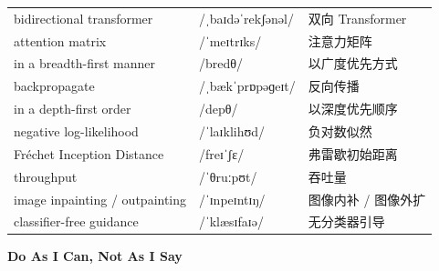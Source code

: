 \documentclass[UTF8,12pt,a4paper]{ctexart}
\providecommand{\zh}[1]{#1}
\begin{document}
\begin{tabular*}{\textwidth}{@{\extracolsep{\fill}}lll@{}}
bidirectional transformer & {\ipafont /ˌbaɪdəˈrekʃənəl/} & \zh{双向 Transformer} \\
attention matrix & {\ipafont /ˈmeɪtrɪks/} & \zh{注意力矩阵} \\
in a breadth-first manner & {\ipafont /bredθ/} & \zh{以广度优先方式} \\
backpropagate & {\ipafont /ˌbækˈprɒpəɡeɪt/} & \zh{反向传播} \\
in a depth-first order & {\ipafont /depθ/} & \zh{以深度优先顺序} \\
negative log-likelihood & {\ipafont /ˈlaɪklihʊd/} & \zh{负对数似然} \\
Fréchet Inception Distance & {\ipafont /freɪˈʃɛ/} & \zh{弗雷歇初始距离} \\
throughput & {\ipafont /ˈθruːpʊt/} & \zh{吞吐量} \\
image inpainting / outpainting & {\ipafont /ˈɪnpeɪntɪŋ/} & \zh{图像内补 / 图像外扩} \\
classifier-free guidance & {\ipafont /ˈklæsɪfaɪə/} & \zh{无分类器引导} \\
\bottomrule
\end{tabular*}

\newpage

\begin{center}
    {\Large\bfseries Do As I Can, Not As I Say}
\end{center}
\end{document}
